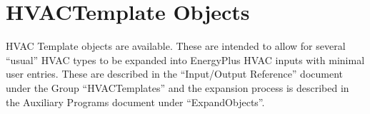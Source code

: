 \section{HVACTemplate Objects}\label{hvactemplate-objects}

HVAC Template objects are available. These are intended to allow for several ``usual'' HVAC types to be expanded into EnergyPlus HVAC inputs with minimal user entries. These are described in the ``Input/Output Reference'' document under the Group ``HVACTemplates'' and the expansion process is described in the Auxiliary Programs document under ``ExpandObjects''.
